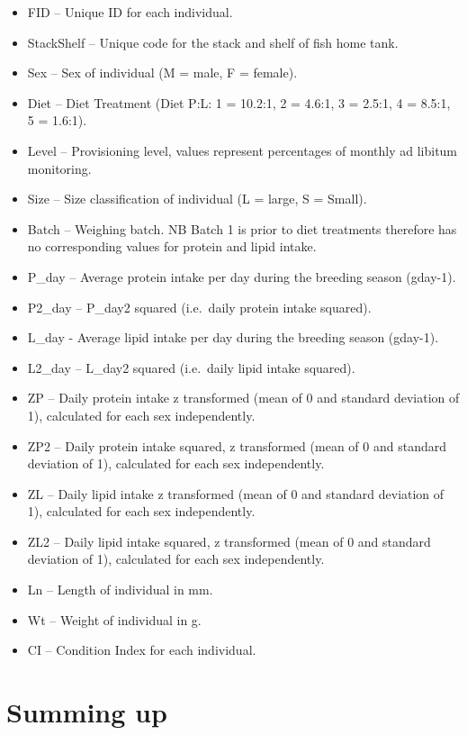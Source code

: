 \documentclass[]{book}
\providecommand{\tightlist}{%
  \setlength{\itemsep}{0pt}\setlength{\parskip}{0pt}}
\begin{document}
\begin{itemize}
\tightlist
\item
  FID -- Unique ID for each individual.
\item
  StackShelf -- Unique code for the stack and shelf of fish home tank.
\item
  Sex -- Sex of individual (M = male, F = female).
\item
  Diet -- Diet Treatment (Diet P:L: 1 = 10.2:1, 2 = 4.6:1, 3 = 2.5:1, 4 = 8.5:1, 5 = 1.6:1).
\item
  Level -- Provisioning level, values represent percentages of monthly ad libitum monitoring.
\item
  Size -- Size classification of individual (L = large, S = Small).
\item
  Batch -- Weighing batch. NB Batch 1 is prior to diet treatments therefore has no corresponding values for protein and lipid intake.
\item
  P\_day -- Average protein intake per day during the breeding season (gday-1).
\item
  P2\_day -- P\_day2 squared (i.e.~daily protein intake squared).
\item
  L\_day - Average lipid intake per day during the breeding season (gday-1).
\item
  L2\_day -- L\_day2 squared (i.e.~daily lipid intake squared).
\item
  ZP -- Daily protein intake z transformed (mean of 0 and standard deviation of 1), calculated for each sex independently.
\item
  ZP2 -- Daily protein intake squared, z transformed (mean of 0 and standard deviation of 1), calculated for each sex independently.
\item
  ZL -- Daily lipid intake z transformed (mean of 0 and standard deviation of 1), calculated for each sex independently.
\item
  ZL2 -- Daily lipid intake squared, z transformed (mean of 0 and standard deviation of 1), calculated for each sex independently.
\item
  Ln -- Length of individual in mm.
\item
  Wt -- Weight of individual in g.
\item
  CI -- Condition Index for each individual.
\end{itemize}

\hypertarget{summing-up}{%
\chapter{Summing up}\label{summing-up}}



\backmatter
\printindex
\end{document}
